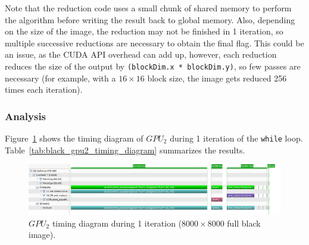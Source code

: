 \documentclass[11pt,a4paper]{article}
\begin{document}
                Note that the reduction code uses a small chunk of shared memory to perform the algorithm before writing the result back to global memory.
                Also, depending on the size of the image, the reduction may not be finished in 1 iteration, so multiple successive reductions are necessary to obtain the final flag.
                This could be an issue, as the CUDA API overhead can add up, however, each reduction reduces the size of the output by \verb+(blockDim.x * blockDim.y)+, so few passes are necessary (for example, with a $16 \times 16$ block size, the image gets reduced 256 times each iteration).


            \subsubsection{Analysis}
                Figure~\ref{fig:black_gpu2_timing_diagram} shows the timing diagram of $GPU_{2}$ during 1 iteration of the \verb+while+ loop.
                Table~\ref{tab:black_gpu2_timing_diagram} summarizes the results.

                \begin{figure}[h]
                    \centering
                    \includegraphics[width=\textwidth]{figs/black_gpu2_timing_diagram.png}
                    \caption{$GPU_{2}$ timing diagram during 1 iteration ($8000 \times 8000$ full black image).}
                    \label{fig:black_gpu2_timing_diagram}
                \end{figure}
\end{document}
